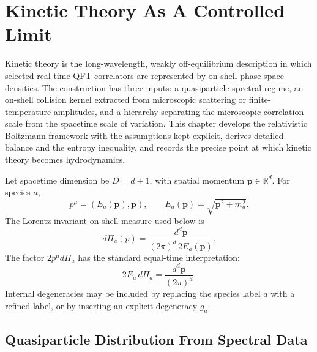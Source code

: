 \chapter{Kinetic Theory As A Controlled Limit}
\label{ch:thermal-kinetic-theory-controlled-limit}

\ConventionsMixed

Kinetic theory is the long-wavelength, weakly off-equilibrium description in
which selected real-time QFT correlators are represented by on-shell
phase-space densities.  The construction has three inputs: a quasiparticle
spectral regime, an on-shell collision kernel extracted from microscopic
scattering or finite-temperature amplitudes, and a hierarchy separating the
microscopic correlation scale from the spacetime scale of variation.  This
chapter develops the relativistic Boltzmann framework with the assumptions
kept explicit, derives detailed balance and the entropy inequality, and
records the precise point at which kinetic theory becomes hydrodynamics.

Let spacetime dimension be \(D=d+1\), with spatial momentum
\(\mathbf p\in\mathbb R^d\).  For species \(a\),
\[
  p^\mu=(E_a(\mathbf p),\mathbf p),
  \qquad
  E_a(\mathbf p)=\sqrt{\mathbf p^2+m_a^2}.
\]
The Lorentz-invariant on-shell measure used below is
\begin{equation}
  d\Pi_a(p)
  =
  \frac{d^d\mathbf p}{(2\pi)^d\,2E_a(\mathbf p)}.
  \label{eq:kinetic-onshell-measure}
\end{equation}
The factor \(2p^\mu d\Pi_a\) has the standard equal-time interpretation:
\[
  2E_a\,d\Pi_a=\frac{d^d\mathbf p}{(2\pi)^d}.
\]
Internal degeneracies may be included by replacing the species label \(a\)
with a refined label, or by inserting an explicit degeneracy \(g_a\).

\section{Quasiparticle Distribution From Spectral Data}

